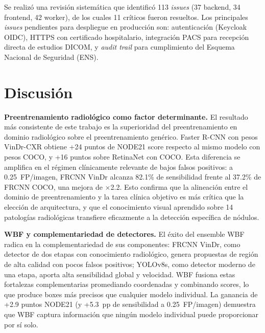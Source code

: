 \documentclass[conference]{IEEEtran}
\begin{document}
Se realiz\'{o} una revisi\'{o}n sistem\'{a}tica que identific\'{o} 113
\textit{issues} (37 backend, 34 frontend, 42 worker), de los cuales 11
cr\'{i}ticos fueron resueltos. Los principales \textit{issues} pendientes
para despliegue en producci\'{o}n son: autenticaci\'{o}n (Keycloak OIDC),
HTTPS con certificado hospitalario, integraci\'{o}n PACS para recepci\'{o}n
directa de estudios DICOM, y \textit{audit trail} para cumplimiento del
Esquema Nacional de Seguridad (ENS).


\section{Discusi\'{o}n}

\textbf{Preentrenamiento radiol\'{o}gico como factor determinante.}
El resultado m\'{a}s consistente de este trabajo es la superioridad del
preentrenamiento en dominio radiol\'{o}gico sobre el preentrenamiento
gen\'{e}rico. Faster R-CNN con pesos VinDr-CXR obtiene +24 puntos de NODE21
score respecto al mismo modelo con pesos COCO, y +16 puntos sobre RetinaNet
con COCO. Esta diferencia se amplifica en el r\'{e}gimen cl\'{i}nicamente
relevante de bajos falsos positivos: a 0.25~FP/imagen, FRCNN VinDr alcanza
82.1\% de sensibilidad frente al 37.2\% de FRCNN COCO, una mejora de
$\times$2.2. Esto confirma que la alineaci\'{o}n entre el dominio de
preentrenamiento y la tarea cl\'{i}nica objetivo es m\'{a}s cr\'{i}tica que la
elecci\'{o}n de arquitectura, y que el conocimiento visual aprendido sobre 14
patolog\'{i}as radiol\'{o}gicas transfiere eficazmente a la detecci\'{o}n
espec\'{i}fica de n\'{o}dulos.

\textbf{WBF y complementariedad de detectores.}
El \'{e}xito del ensemble WBF radica en la complementariedad de sus
componentes: FRCNN VinDr, como detector de dos etapas con conocimiento
radiol\'{o}gico, genera propuestas de regi\'{o}n de alta calidad con pocos
falsos positivos; YOLOv8s, como detector moderno de una etapa, aporta alta
sensibilidad global y velocidad. WBF fusiona estas fortalezas complementarias
promediando coordenadas y combinando scores, lo que produce boxes m\'{a}s
precisos que cualquier modelo individual. La ganancia de +2.9 puntos NODE21
(y +5.3~pp de sensibilidad a 0.25~FP/imagen) demuestra que WBF captura
informaci\'{o}n que ning\'{u}n modelo individual puede proporcionar por
s\'{i} solo.
\end{document}
